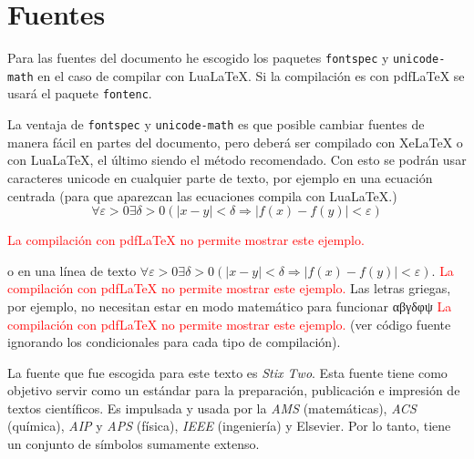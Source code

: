 
\chapter{Fuentes}
Para las fuentes del documento he escogido los paquetes \texttt{fontspec} y
\texttt{unicode-math} en el caso de compilar con Lua\LaTeX. Si la
compilación es con pdf\LaTeX{} se usará el paquete \texttt{fontenc}.

La ventaja de \texttt{fontspec} y \texttt{unicode-math} es que posible
cambiar fuentes de manera fácil en partes del documento, pero deberá ser
compilado con Xe\LaTeX{} o con Lua\LaTeX, el último siendo el método
recomendado. Con esto se podrán usar caracteres unicode en cualquier parte
de texto, por ejemplo en una ecuación centrada (para que aparezcan las
ecuaciones compila con Lua\LaTeX.)
\ifluatex%
\[
  ∀ε>0∃δ>0(|x-y|<δ ⇒ |f(x)-f(y)|<ε)
\]
\else
\ifpdftex%
\begin{center}
\textcolor{red}{La compilación con pdf\LaTeX{} no permite mostrar este
ejemplo.}
\end{center}
\fi
\fi
o en una línea de texto%
\ifluatex%
\(∀ε>0∃δ>0(|x-y|<δ ⇒ |f(x)-f(y)|<ε)\).
\else
\ifpdftex%
\textcolor{red}{La compilación con pdf\LaTeX{} no permite mostrar este
ejemplo.}
\fi
\fi
Las letras griegas, por ejemplo, no necesitan estar en modo matemático para
funcionar
\ifluatex%
αβγδφψ
\else
\ifpdftex%
\textcolor{red}{La compilación con pdf\LaTeX{} no permite mostrar este
ejemplo.}
\fi
\fi
(ver código fuente ignorando los condicionales para cada tipo de
compilación).

La fuente que fue escogida para este texto es \textit{Stix Two}. Esta fuente
tiene como objetivo servir como un estándar para la preparación, publicación
e impresión de textos científicos. Es impulsada y usada por la \textit{AMS}
(matemáticas), \textit{ACS} (química), \textit{AIP} y \textit{APS} (física),
\textit{IEEE} (ingeniería) y Elsevier. Por lo tanto, tiene un conjunto de
símbolos sumamente extenso.

